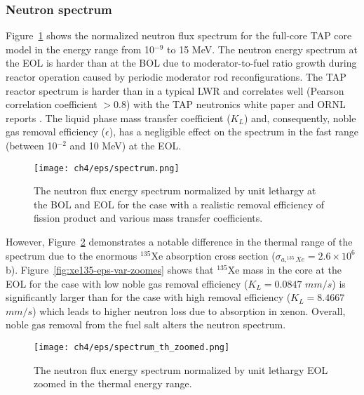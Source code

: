 \subsubsection{Neutron spectrum}
Figure~\ref{fig:spectrum-eps-var} shows the normalized neutron flux spectrum 
for the full-core TAP core model in the energy range from 10$^{-9}$ to 15 MeV. 
The neutron energy spectrum at the \gls{EOL} is harder than at 
the \gls{BOL} due to moderator-to-fuel ratio growth during reactor operation 
caused by periodic moderator rod reconfigurations. The \gls{TAP} reactor 
spectrum is harder than in a typical \gls{LWR} and correlates well (Pearson 
correlation coefficient $>0.8$) with the \gls{TAP} neutronics white paper  
\cite{transatomic_power_corporation_neutronics_2016} and ORNL 
reports \cite{betzler_assessment_2017-1, betzler_two-dimensional_2017}.
The liquid phase mass transfer coefficient ($K_L$) and, consequently, noble 
gas removal efficiency ($\epsilon$), has a negligible effect on the spectrum 
in the fast range (between 10$^{-2}$ and 10 MeV) at the \gls{EOL}. 
\begin{figure}[htp!] %
	\centering
	\texttt{[image: ch4/eps/spectrum.png]}
		\vspace{-3mm}
	\caption{The neutron flux energy spectrum normalized by unit lethargy at 
		the \gls{BOL} and \gls{EOL}	for the case with a realistic removal 
		efficiency of fission product and various mass transfer coefficients.}
	\label{fig:spectrum-eps-var}
\end{figure}

However, Figure~\ref{fig:spectrum-th-eps-var} demonstrates a notable 
difference in the thermal range of the spectrum due to the enormous $^{135}$Xe 
absorption cross section ($\sigma_{a,^{135}Xe}=2.6\times10^6$ b). 
Figure~\ref{fig:xe135-eps-var-zoomes} shows that $^{135}$Xe mass in the core 
at the \gls{EOL} for the case with low noble gas removal efficiency 
($K_L=0.0847$ $mm/s$) is significantly larger than for the case with high 
removal efficiency ($K_L=8.4667$ $mm/s$) which leads to higher neutron loss 
due to absorption in xenon. Overall, noble gas removal from the fuel salt 
alters the neutron spectrum.
\begin{figure}[htp!] %
	\centering
	\texttt{[image: ch4/eps/spectrum\_th\_zoomed.png]}
			\vspace{-3mm}
	\caption{The neutron flux energy spectrum normalized by unit lethargy  
		\gls{EOL} zoomed in the thermal energy range.}
	\label{fig:spectrum-th-eps-var}
\end{figure}


